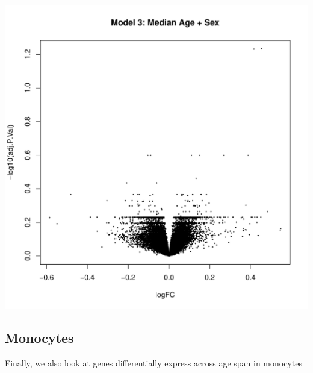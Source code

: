 \documentclass[]{article}
\begin{document}
\includegraphics{./Vplot.mod3.pdf}

\hypertarget{monocytes}{%
\subsection{Monocytes}\label{monocytes}}

Finally, we also look at genes differentially express across age span in
monocytes
\end{document}
